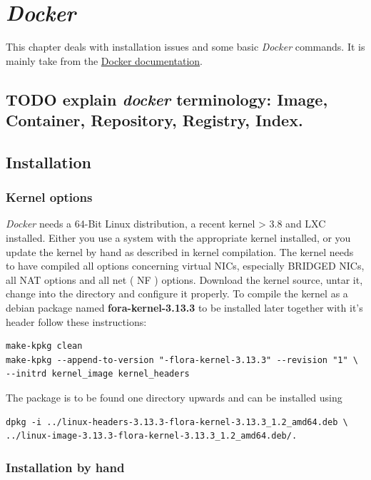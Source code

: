 \documentclass[11pt]{article}
\begin{document}
\section{\emph{Docker}}
\label{sec-2}

This chapter deals with installation issues and some basic \emph{Docker} commands. It is mainly take from the \href{http://docs.docer.io/en/latest/}{Docker documentation}. 
\subsection{\textbf{TODO} explain \emph{docker} terminology: Image, Container, Repository, Registry, Index.}
\label{sec-2-1}
\subsection{Installation}
\label{sec-2-2}
\subsubsection{Kernel options}
\label{sec-2-2-1}

\emph{Docker} needs a 64-Bit Linux distribution, a recent kernel > 3.8 and LXC
installed. Either you use a system with the appropriate kernel installed, or
you update the kernel by hand as described in kernel compilation. The kernel needs to have compiled all options concerning virtual NICs, especially
BRIDGED NICs, all NAT options and all net  ( NF ) options. Download
the kernel source, untar it, change into the directory and configure it properly. To compile the kernel as a debian package named \textbf{fora-kernel-3.13.3}
to be installed later together with it's header follow these instructions:

\begin{verbatim}
make-kpkg clean
make-kpkg --append-to-version "-flora-kernel-3.13.3" --revision "1" \
--initrd kernel_image kernel_headers
\end{verbatim}
The package is to be found one directory upwards and can be installed using

\begin{verbatim}
dpkg -i ../linux-headers-3.13.3-flora-kernel-3.13.3_1.2_amd64.deb \
../linux-image-3.13.3-flora-kernel-3.13.3_1.2_amd64.deb/.
\end{verbatim}
\subsubsection{Installation by hand}
\label{sec-2-2-2}
\end{document}
